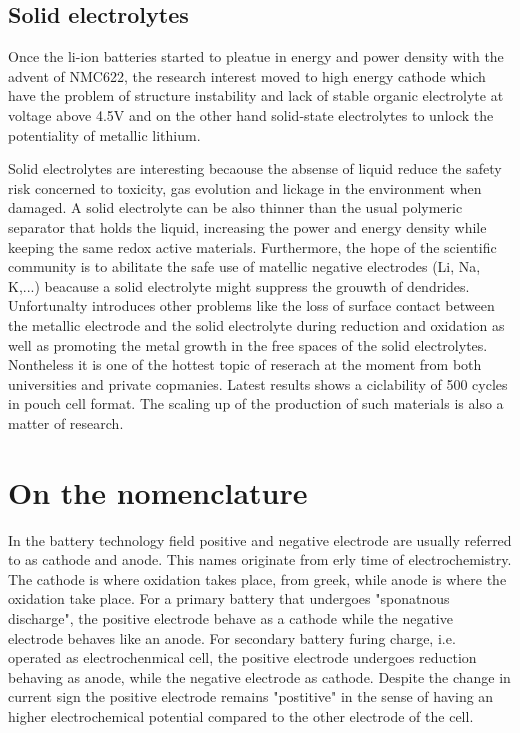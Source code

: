 \subsection{Solid electrolytes}

Once the li-ion batteries started to pleatue in energy and power density with the advent of NMC622, the research interest moved to high energy cathode which have the problem of structure instability and lack of stable organic electrolyte at voltage above 4.5V and on the other hand solid-state electrolytes to unlock the potentiality of metallic lithium.

Solid electrolytes are interesting becaouse the absense of liquid reduce the safety risk concerned to toxicity, gas evolution and lickage in the environment when damaged. A solid electrolyte can be also thinner than the usual polymeric separator that holds the liquid, increasing the power and energy density while keeping the same redox active materials. Furthermore, the hope of the scientific community is to abilitate the safe use of matellic negative electrodes (Li, Na, K,...) beacause a solid electrolyte  might suppress the grouwth of dendrides. Unfortunalty introduces other problems like the loss of surface contact between the metallic electrode and the solid electrolyte during reduction and oxidation as well as promoting the metal growth in the free spaces of the solid electrolytes. Nontheless it is one of the hottest topic of reserach at the moment from both universities and private copmanies. Latest results shows a ciclability of 500 cycles in pouch cell format. The scaling up of the production of such materials is also a matter of research.


\section{On the nomenclature}

In the battery technology field positive and negative electrode are usually referred to as cathode and anode. This names originate from erly time of electrochemistry. The cathode is where oxidation takes place, from greek, while anode is where the oxidation take place. For a primary battery that undergoes "sponatnous discharge", the positive electrode behave as a cathode while the negative electrode behaves like an anode. For secondary battery furing charge, i.e. operated as electrochenmical cell, the positive electrode undergoes reduction behaving as anode, while the negative electrode as cathode. Despite the change in current sign the positive electrode remains "postitive" in the sense of having an higher electrochemical potential compared to the other electrode of the cell.

